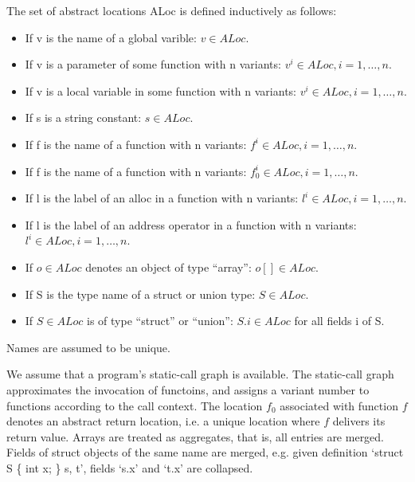 \begin{Definition}
  The set of abstract locations ALoc is defined inductively as follows:
  \begin{itemize}
  \item If v is the name of a global varible: $v \in ALoc$.
  \item If v is a parameter of some function with n variants:
    $v^i \in ALoc, i = 1, \dots, n$.
  \item If v is a local variable in some function with n variants:
    $v^i \in ALoc, i = 1, \dots, n$.
  \item If s is a string constant: $s \in ALoc$.
  \item If f is the name of a function with n variants:
    $f^i \in ALoc, i = 1, \dots, n$.
  \item If f is the name of a function with n variants:
    $f^i_0 \in ALoc, i = 1, \dots, n$.
  \item If l is the label of an alloc in a function with n variants:
    $l^i \in ALoc, i = 1, \dots, n$.
  \item If l is the label of an address operator in a function with n variants:
    $l^i \in ALoc, i = 1, \dots, n$.
  \item If $o \in ALoc$ denotes an object of type ``array'': $o[] \in ALoc$.
  \item If S is the type name of a struct or union type: $S \in ALoc$.
  \item If $S \in ALoc$ is of type ``struct'' or ``union'':
    $S.i \in ALoc$ for all fields i of S.
  \end{itemize}
  Names are assumed to be unique.
\end{Definition}

We assume that a program's static-call graph is available. The static-call graph
approximates the invocation of functoins, and assigns a variant number to
functions according to the call context. The location $f_0$ associated with
function $f$ denotes an abstract return location, i.e. a unique location where
$f$ delivers its return value. Arrays are treated as aggregates, that is, all
entries are merged. Fields of struct objects of the same name are merged, e.g.
given definition `struct S \{ int x; \} s, t', fields `s.x' and `t.x' are
collapsed.


